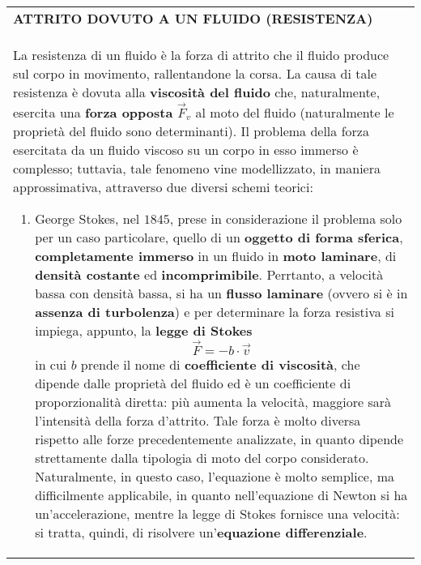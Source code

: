 \documentclass[a4paper]{extarticle}
\renewcommand\arraystretch{}
\begin{document}
\vspace{1em}
\setlength{\tabcolsep}{14pt}
\renewcommand{\arraystretch}{2}
\noindent
\begin{tabularx}{\textwidth}{@{}|P|@{}}
    \hline
    {\textbf{ATTRITO DOVUTO A UN FLUIDO (RESISTENZA)}}\\
    \parbox{\linewidth}{La resistenza di un fluido è la forza di attrito che il fluido produce sul corpo in movimento, rallentandone la corsa. La causa di tale resistenza è dovuta alla \textbf{viscosità del fluido} che, naturalmente, esercita una \textbf{forza opposta} $\vec{F}_v$ al moto del fluido (naturalmente le proprietà del fluido sono determinanti).\\
    Il problema della forza esercitata da un fluido viscoso su un corpo in esso immerso è complesso; tuttavia, tale fenomeno vine modellizzato, in maniera approssimativa, attraverso due diversi schemi teorici:
    \begin{enumerate}
      \item George Stokes, nel $1845$, prese in considerazione il problema solo per un caso particolare, quello di un \textbf{oggetto di forma sferica}, \textbf{completamente immerso} in un fluido in \textbf{moto laminare}, di \textbf{densità costante} ed \textbf{incomprimibile}.\\
      Perrtanto, a velocità bassa con densità bassa, si ha un \textbf{flusso laminare} (ovvero si è in \textbf{assenza di turbolenza}) e per determinare la forza resistiva si impiega, appunto, la \textbf{legge di Stokes}
      \[\boxed{\vec{F} = -b \cdot \vec{v}}\]
      in cui $b$ prende il nome di \textbf{coefficiente di viscosità}, che dipende dalle proprietà del fluido ed è un coefficiente di proporzionalità diretta: più aumenta la velocità, maggiore sarà l'intensità della forza d'attrito. Tale forza è molto diversa rispetto alle forze precedentemente analizzate, in quanto dipende strettamente dalla tipologia di moto del corpo considerato. Naturalmente, in questo caso, l'equazione è molto semplice, ma difficilmente applicabile, in quanto nell'equazione di Newton si ha un'accelerazione, mentre la legge di Stokes fornisce una velocità: si tratta, quindi, di risolvere un'\textbf{equazione differenziale}.


\end{enumerate}}
\end{tabularx}
\end{document}
